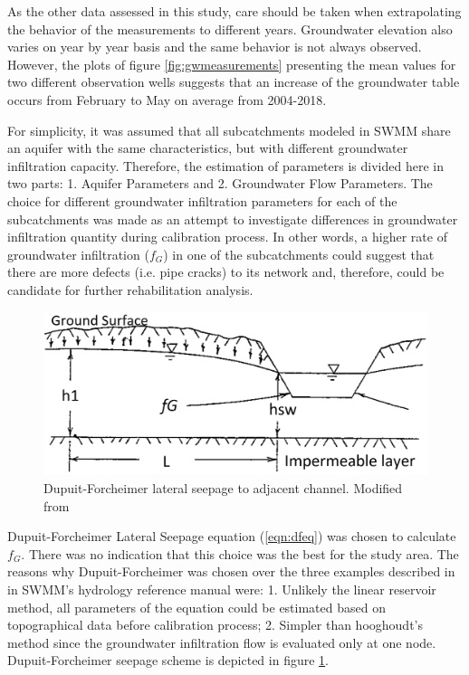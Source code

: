 As the other data assessed in this study, care should be taken when extrapolating the behavior of the measurements to different years. Groundwater elevation also varies on year by year basis and the same behavior is not always observed. However, the plots of figure \ref{fig:gwmeasurements} presenting the mean values for two different observation wells suggests that an increase of the groundwater table occurs from February to May on average from 2004-2018. 
    


For simplicity, it was assumed that all subcatchments modeled in SWMM share an aquifer with the same characteristics, but with different groundwater infiltration capacity. Therefore, the estimation of parameters is divided here in two parts: 1. Aquifer Parameters and 2. Groundwater Flow Parameters. The choice for different groundwater infiltration parameters for each of the subcatchments was made as an attempt to investigate differences in groundwater infiltration quantity during calibration process. In other words, a higher rate of groundwater infiltration ($f_G$) in one of the subcatchments could suggest that there are more defects (i.e. pipe cracks) to its network and, therefore, could be candidate for further rehabilitation analysis.

\begin{figure}[h]
    \centering
	\includegraphics[scale=0.4]{figures/dfscheme.png}
	\caption{Dupuit-Forcheimer lateral seepage to adjacent channel. Modified from} %
	\label{fig:dfscheme}
\end{figure}

Dupuit-Forcheimer Lateral Seepage equation (\ref{eqn:dfeq}) was chosen to calculate $f_G$. There was no indication that this choice was the best for the study area. The reasons why Dupuit-Forcheimer was chosen over the three examples described in in SWMM's hydrology reference manual \cite{Rossman2016} were:  1. Unlikely the linear reservoir method, all parameters of the equation could be estimated based on topographical data before calibration process; 2. Simpler than hooghoudt's method since the groundwater infiltration flow is evaluated only at one node. Dupuit-Forcheimer seepage scheme is depicted in figure \ref{fig:dfscheme}.



